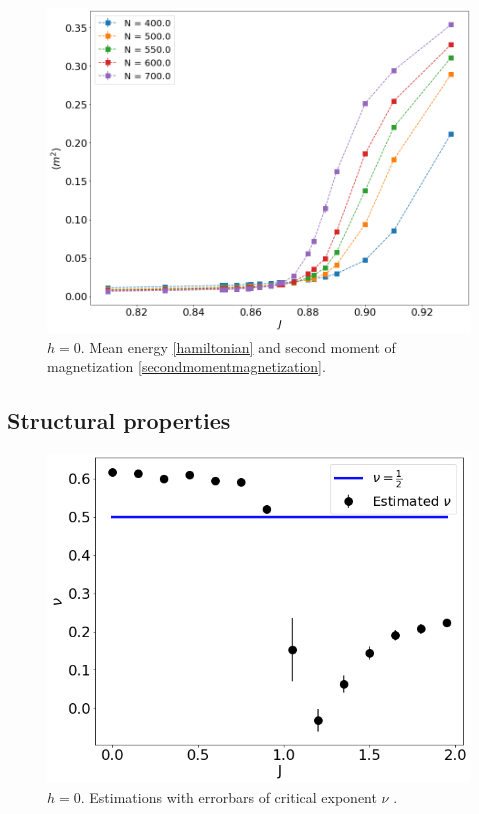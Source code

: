 \begin{figure}[t]
	\includegraphics[scale=0.23]{Images/3_magnetization2_longchains.png}
	\caption{$h=0$. Mean energy \eqref{hamiltonian} and   second moment of magnetization \eqref{secondmomentmagnetization}. }
	\label{fig:energymagshort_3D}
\end{figure}


\subsection{Structural properties}


 \begin{figure}[H]
	\centering
	\includegraphics[scale=0.36]{Images/3_nu_shortchains.png}
	\caption{$h=0$. Estimations with errorbars of critical exponent $\nu$ .   }
	\label{fig:nushort3D}
\end{figure}



